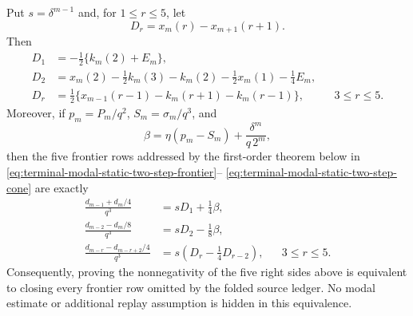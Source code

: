 \begin{lemma}
\label{lem:terminal-modal-static-five-frontier-reduction}
Put $s=\delta^{m-1}$ and, for $1\le r\le5$, let
\begin{equation}
 D_r=x_m(r)-x_{m+1}(r+1).
 \label{eq:terminal-modal-static-frontier-Dr-definition}
\end{equation}
Then
\begin{align}
 D_1&=-\frac12\{k_m(2)+E_m\},
 \label{eq:terminal-modal-static-frontier-D1}\\
 D_2&=x_m(2)-\frac12k_m(3)-k_m(2)
       -\frac12x_m(1)-\frac14E_m,
 \label{eq:terminal-modal-static-frontier-D2}\\
 D_r&=\frac12\{x_{m-1}(r-1)-k_m(r+1)-k_m(r-1)\},
 &&3\le r\le5.
 \label{eq:terminal-modal-static-frontier-Dr}
\end{align}
Moreover, if $p_m=P_m/q^2$, $S_m=\sigma_m/q^3$, and
\begin{equation}
 \beta=\eta(p_m-S_m)+\frac{\delta^m}{q\,2^m},
 \label{eq:terminal-modal-static-frontier-beta}
\end{equation}
then the five frontier rows addressed by the first-order theorem below in
\eqref{eq:terminal-modal-static-two-step-frontier}--
\eqref{eq:terminal-modal-static-two-step-cone} are exactly
\begin{align}
 \frac{d_{m-1}+d_m/4}{q^3}
   &=sD_1+\frac14\beta,
 \label{eq:terminal-modal-static-frontier-margin-1}\\
 \frac{d_{m-2}-d_m/8}{q^3}
   &=sD_2-\frac18\beta,
 \label{eq:terminal-modal-static-frontier-margin-2}\\
 \frac{d_{m-r}-d_{m-r+2}/4}{q^3}
   &=s\left(D_r-\frac14D_{r-2}\right),
 &&3\le r\le5.
 \label{eq:terminal-modal-static-frontier-margin-r}
\end{align}
Consequently, proving the nonnegativity of the five right sides above is
equivalent to closing every frontier row omitted by the folded source ledger.
No modal estimate or additional replay assumption is hidden in this
equivalence.
\end{lemma}

